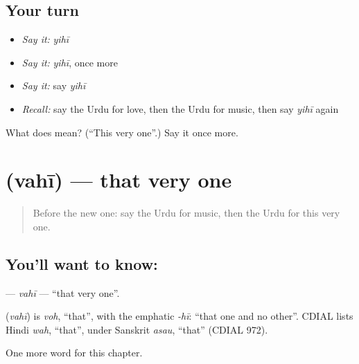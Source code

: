 \subsection*{Your turn}
\begin{itemize}
\raggedright
  \item \emph{Say it:} \emph{yihī}
  \item \emph{Say it:} \emph{yihī}, once more
  \item \emph{Say it:} say \emph{yihī}
  \item \emph{Recall:} say the Urdu for love, then the Urdu for music, then say \emph{yihī} again
\end{itemize}

\begin{tcolorbox}[breakable,colback=teal!4,colframe=teal!35!black,title={Before you move on}]
What does  mean? (\textquotedblleft{}This very one\textquotedblright{}.) Say it once more.
\end{tcolorbox}
\section[\texorpdfstring{\ur{وہی} (vahī)}{وہی (vahī)}]{ (vahī) — that very one}

\label{lesson:UR-C88-vahi}



\begin{quote}
Before the new one: say the Urdu for music, then the Urdu for this very one.
\end{quote}

\subsection*{You'll want to know: }
\textbf{} — \emph{vahī} — \textquotedblleft{}that very one\textquotedblright{}.

\begin{cousinweb}
\textbf{} (\emph{vahī}) is \emph{voh}, \textquotedblleft{}that\textquotedblright{}, with the emphatic \emph{-hī}: \textquotedblleft{}that one and no other\textquotedblright{}. CDIAL lists Hindi \emph{wah}, \textquotedblleft{}that\textquotedblright{}, under Sanskrit \emph{asau}, \textquotedblleft{}that\textquotedblright{} (CDIAL 972).
\end{cousinweb}

\begin{grammarlens}[title={What you've built}]
One more word for this chapter.
\end{grammarlens}

